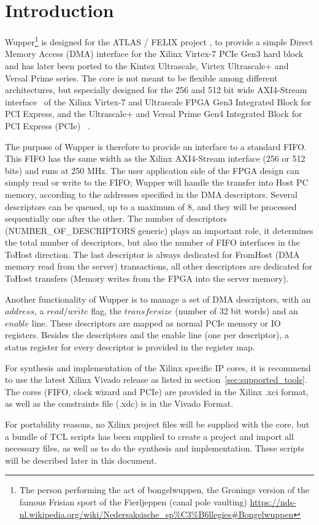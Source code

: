 \section{Introduction}
Wupper\footnote{The person performing the act of bongelwuppen, the Gronings version of the famous Frisian sport of the Fierljeppen (canal pole vaulting) \url{https://nds-nl.wikipedia.org/wiki/Nedersaksische_sp\%C3\%B6llegies\#Bongelwuppen}} is designed for the ATLAS / FELIX project \cite{felix}, to provide a simple
Direct Memory Access (DMA) interface for the Xilinx Virtex-7 PCIe Gen3 hard block and has later been ported to the Kintex Ultrascale, Virtex Ultrascale+ and Versal Prime series. The core is not meant to be flexible among different architectures, but especially designed for the 256 and 512 bit wide AXI4-Stream interface~\cite{ug761}  of the Xilinx Virtex-7 and Ultrascale FPGA Gen3 Integrated Block for PCI Express, and the Ultrascale+ and Versal Prime Gen4 Integrated Block for PCI Express (PCIe) ~\cite{pg023, pg156, pg213, pg343}.

The purpose of Wupper is therefore to provide an interface to a standard FIFO. This FIFO has the same width as the Xilinx AXI4-Stream interface (256 or 512 bits) and runs at 250 MHz. The user application side of the FPGA design can simply read or write to the FIFO; Wupper will handle the transfer into Host PC memory, according to the addresses specified in the DMA descriptors. Several descriptors can be queued, up to a maximum of 8, and they will be processed sequentially one after the other. The number of descriptors (NUMBER\_OF\_DESCRIPTORS generic) plays an important role, it determines the total number of descriptors, but also the number of FIFO interfaces in the ToHost direction. The last descriptor is always dedicated for FromHost (DMA memory read from the server) transactions, all other descriptors are dedicated for ToHost transfers (Memory writes from the FPGA into the server memory). 

Another functionality of Wupper is to manage a set of DMA descriptors, with an $address$, a $read/\overline{write}$ flag, the $transfer size$ (number of 32 bit words) and an $enable$ line. These descriptors are mapped as normal PCIe memory or IO registers. Besides the descriptors and the enable line (one per descriptor), a status register for every descriptor is provided in the register map.

For synthesis and implementation of the Xilinx specific IP cores, it is recommend to use the latest Xilinx Vivado release as listed in section~\ref{sec:supported_tools}. The cores (FIFO, clock wizard and PCIe) are provided in the Xilinx .xci format, as well as the constraints file (.xdc) is in the Vivado Format.

For portability reasons, no Xilinx project files will be supplied with the core, but a bundle of TCL scripts has been supplied to create a project and import all necessary files, as well as to do the synthesis and implementation. These scripts will be described later in this document.


\newpage
